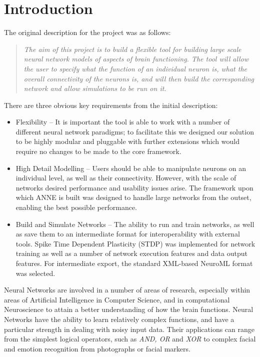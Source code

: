 \documentclass{acm_proc_article-sp}
\begin{document}
\section{Introduction}
{
The original description for the project was as follows:

\begin{quote}
\textit
{
The aim of this project is to build a flexible tool for building large scale neural network models of aspects of brain functioning. The tool will allow the user to specify what the function of an individual neuron is, what the overall connectivity of the neurons is, and will then build the corresponding network and allow simulations to be run on it.
}
\end{quote}

There are three obvious key requirements from the initial description:
\begin{itemize}
\item 
{
Flexibility {--} It is important the tool is able to work with a number of different neural network paradigms; to facilitate this we designed our solution to be highly modular and pluggable with further extensions which would require no changes to be made to the core framework.
}
\item 
{
High Detail Modelling {--} Users should be able to manipulate neurons on an individual level, as well as their connectivity. However, with the scale of networks desired performance and usability issues arise. The framework upon which ANNE is built was designed to handle large networks from the outset, enabling the best possible performance.
}
\item 
{
Build and Simulate Networks {--} The ability to run and train networks, as well as save them to an intermediate format for interoperability with external tools. Spike Time Dependent Plasticity (STDP) was implemented for network training as well as a number of network execution features and data output features. For intermediate export, the standard XML{}-based NeuroML format was selected.
}
\end{itemize}

Neural Networks are involved in a number of areas of research, especially within areas of Artificial Intelligence in Computer Science, and in computational Neuroscience to attain a better understanding of how the brain functions. Neural Networks have the ability to learn relatively complex functions, and have a particular strength in dealing with noisy input data. Their applications can range from the simplest logical operators, such as {\textit{AND, OR}} and {\textit{XOR}} to complex facial and emotion recognition from photographs or facial markers.

}
\end{document}
